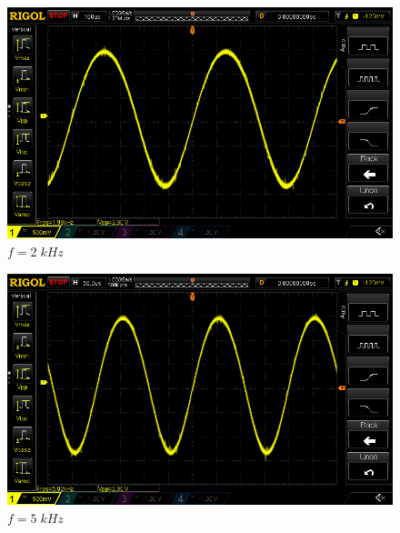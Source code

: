 \documentclass[uplatex,a4paper,11pt,oneside,openany]{jsbook}
\begin{document}
\begin{spacing}{0.67}
  \begin{multicols}{2}
    \begin{figure}[H]
       \centering
        \includegraphics[keepaspectratio, scale=0.28, angle=0]
                    {rigol/figs/FrqCharM1Y1_2kR/2khz.png}
                    \caption{$f=2\;kHz$}
                    \label{fig:frq2k}
    \end{figure}
  
    \begin{figure}[H]
       \centering
        \includegraphics[keepaspectratio, scale=0.28, angle=0]
                  {rigol/figs/FrqCharM1Y1_2kR/5khz.png}
                  \caption{$f=5\;kHz$}
                  \label{fig:frq5k}
    \end{figure}
  \end{multicols}


\end{spacing}
\end{document}
